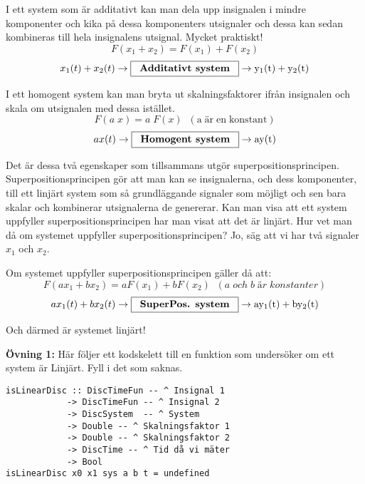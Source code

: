 \documentclass{article}
\begin{document}
I ett system som är additativt kan man dela upp insignalen i mindre
komponenter och kika på dessa komponenters utsignaler och dessa kan sedan
kombineras till hela insignalens utsignal. Mycket praktiskt!
$$F(x_{1}+x_{2}) = F(x_{1}) + F(x_{2})$$
$$x_{1}(t) + x_{2}(t) \rightarrow \framebox[1.2\width]{\textbf{Additativt system}} \rightarrow \mathrm{y_{1}(t) + y_{2}(t)}$$

I ett homogent system kan man bryta ut skalningsfaktorer ifrån insignalen och skala om utsignalen med dessa istället.
$$F(a \; x) = a\;F(x)\;\;\mathrm{(a\; är\; en\; konstant)} $$
$$a x(t) \rightarrow \framebox[1.2\width]{\textbf{Homogent system}} \rightarrow \mathrm{a y(t)}$$

Det är dessa två egenskaper som tillsammans utgör superpositionsprincipen.
Superpositionsprincipen gör att man kan se insignalerna, och dess
komponenter, till ett linjärt system som så grundläggande signaler som
möjligt och sen bara skalar och kombinerar utsignalerna de genererar.
Kan man visa att
ett system uppfyller superpositionsprincipen har man visat att det är
linjärt.
Hur vet man då om systemet uppfyller superpositionsprincipen? Jo, säg att vi har två signaler $x_1$ och $x_2$.

Om systemet uppfyller superpositionsprincipen gäller då att:
$$F(a x_{1}+b x_{2}) = a F(x_{1}) + b F(x_{2})
\;\;(a\; och\; b\; är\; konstanter) $$
$$a x_{1}(t)+b x_{2}(t) \rightarrow \framebox[1.2\width]{\textbf{SuperPos. system}} \rightarrow \mathrm{a y_{1}(t)+b y_{2}(t)}
$$

Och därmed är systemet linjärt!

\textbf{Övning 1:} Här följer ett kodskelett till en funktion som undersöker om ett
system är Linjärt. Fyll i det som saknas.

\begin{verbatim}
isLinearDisc :: DiscTimeFun -- ^ Insignal 1
            -> DiscTimeFun -- ^ Insignal 2
            -> DiscSystem  -- ^ System
            -> Double -- ^ Skalningsfaktor 1
            -> Double -- ^ Skalningsfaktor 2
            -> DiscTime -- ^ Tid då vi mäter
            -> Bool
isLinearDisc x0 x1 sys a b t = undefined
\end{verbatim}
\end{document}
